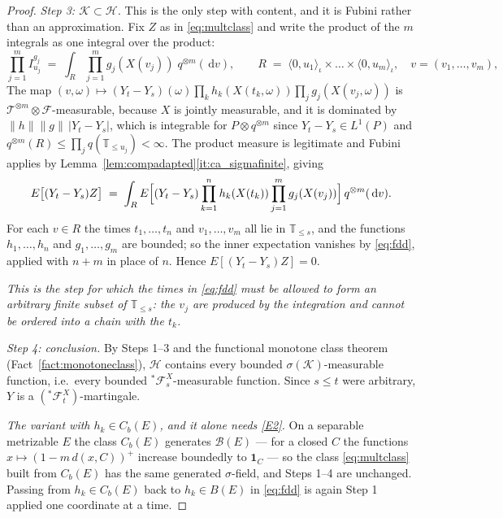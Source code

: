 \documentclass[11pt,a4paper]{article}
\theoremstyle{plain}
\theoremstyle{definition}
\theoremstyle{remark}
\newcommand{\T}{\mathbb{T}}                     %
\newcommand{\Bor}{\mathcal{B}}                 %
\newcommand{\Bdd}{B}                           %
\newcommand{\Cb}{C_b}                          %
\newcommand{\Filt}{\mathcal{F}}
\newcommand{\one}{\mathbf{1}}
\newcommand{\dif}{\,\mathrm{d}}
\begin{document}
\begin{proof}
  \emph{Step 3: $\mathcal{K} \subset \mathcal{H}$.}  This is the only step with
  content, and it is Fubini rather than an approximation.  Fix $Z$ as in
  \eqref{eq:multclass} and write the product of the $m$ integrals as one integral
  over the product:
  \[
    \prod_{j=1}^m I^{g_j}_{u_j}
      \;=\; \int_{R} \prod_{j=1}^m g_j(X(v_j)) \; q^{\otimes m}(\dif v) ,
    \qquad
    R \;=\; \langle 0,u_1 \rangle_\iota \times \dots \times \langle 0,u_m \rangle_\iota ,
    \quad v = (v_1,\dots,v_m) ,
  \]
  The map $(v,\omega) \mapsto (Y_t-Y_s)(\omega) \prod_k h_k(X(t_k,\omega))
  \prod_j g_j(X(v_j,\omega))$ is $\mathcal{T}^{\otimes m} \otimes \Filt$-measurable,
  because $X$ is jointly measurable, and it is dominated by
  $\lVert h \rVert \lVert g \rVert \, |Y_t - Y_s|$, which is integrable for
  $P \otimes q^{\otimes m}$ since $Y_t - Y_s \in L^1(P)$ and
  $q^{\otimes m}(R) \leq \prod_j q(\T_{\leq u_j}) < \infty$.  The product measure
  is legitimate and Fubini applies by
  Lemma~\ref{lem:compadapted}\ref{it:ca_sigmafinite}, giving
  \[
    E\bigl[ (Y_t - Y_s) Z \bigr]
      \;=\; \int_{R}
        E\Bigl[ (Y_t - Y_s) \prod_{k=1}^n h_k(X(t_k))
          \prod_{j=1}^m g_j(X(v_j)) \Bigr] \, q^{\otimes m}(\dif v) .
  \]
  For each $v \in R$ the times $t_1,\dots,t_n$ and $v_1,\dots,v_m$ all lie in
  $\T_{\leq s}$, and the functions $h_1,\dots,h_n$ and $g_1,\dots,g_m$ are
  bounded; so the inner expectation vanishes by \eqref{eq:fdd}, applied with
  $n+m$ in place of $n$.  Hence
  $E[(Y_t-Y_s)Z] = 0$.

  \emph{This is the step for which the times in \eqref{eq:fdd} must be allowed to
  form an arbitrary finite subset of $\T_{\leq s}$: the $v_j$ are produced by the
  integration and cannot be ordered into a chain with the $t_k$.}

  \emph{Step 4: conclusion.}  By Steps 1--3 and the functional monotone class
  theorem (Fact~\ref{fact:monotoneclass}), $\mathcal{H}$ contains every bounded
  $\sigma(\mathcal{K})$-measurable function, i.e.\ every bounded
  ${}^{*}\Filt^X_s$-measurable function.  Since $s \leq t$ were arbitrary,
  $Y$ is a $({}^{*}\Filt^X_t)$-martingale.

  \emph{The variant with $h_k \in \Cb(E)$, and it alone needs \eqref{E2}.}  On a
  separable metrizable $E$ the class $\Cb(E)$ generates $\Bor(E)$ --- for a closed
  $C$ the functions $x \mapsto (1 - m\,d(x,C))^+$ increase boundedly to $\one_C$ ---
  so the class \eqref{eq:multclass} built from $\Cb(E)$ has the same generated
  $\sigma$-field, and Steps 1--4 are unchanged.  Passing from
  $h_k \in \Cb(E)$ back to $h_k \in \Bdd(E)$ in \eqref{eq:fdd} is again Step 1
  applied one coordinate at a time.


\end{proof}
\end{document}
